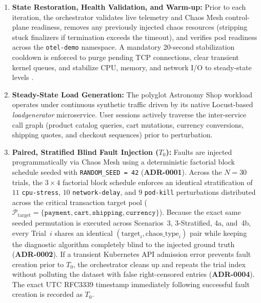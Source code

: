 \begin{enumerate}
    \item \textbf{State Restoration, Health Validation, and Warm-up:} Prior to each iteration, the orchestrator validates live telemetry and Chaos Mesh control-plane readiness, removes any previously injected chaos resources (stripping stuck finalizers if termination exceeds the timeout), and verifies pod readiness across the \texttt{otel-demo} namespace. A mandatory 20-second stabilization cooldown is enforced to purge pending TCP connections, clear transient kernel queues, and stabilize CPU, memory, and network I/O to steady-state levels \cite{jain_1991, georges_2007}.
    
    \item \textbf{Steady-State Load Generation:} The polyglot Astronomy Shop workload operates under continuous synthetic traffic driven by its native Locust-based \textit{loadgenerator} microservice. User sessions actively traverse the inter-service call graph (product catalog queries, cart mutations, currency conversions, shipping quotes, and checkout sequences) prior to perturbation.
    
    \item \textbf{Paired, Stratified Blind Fault Injection ($T_0$):} Faults are injected programmatically via Chaos Mesh using a deterministic factorial block schedule seeded with \texttt{RANDOM\_SEED = 42} (\textbf{ADR-0001}). Across the $N=30$ trials, the $3 \times 4$ factorial block schedule enforces an identical stratification of $11$ \texttt{cpu-stress}, $10$ \texttt{network-delay}, and $9$ \texttt{pod-kill} perturbations distributed across the critical transaction target pool ($\mathcal{P}_{\text{target}} = \{\texttt{payment}, \texttt{cart}, \texttt{shipping}, \texttt{currency}\}$). Because the exact same seeded permutation is executed across Scenarios~3, 3-Stratified, 4a, and~4b, every Trial~$i$ shares an identical $(\text{target}_i, \text{chaos\_type}_i)$ pair while keeping the diagnostic algorithm completely blind to the injected ground truth (\textbf{ADR-0002}). If a transient Kubernetes API admission error prevents fault creation prior to $T_0$, the orchestrator cleans up and repeats the trial index without polluting the dataset with false right-censored entries (\textbf{ADR-0004}). The exact UTC RFC3339 timestamp immediately following successful fault creation is recorded as $T_0$.
    

\end{enumerate}
